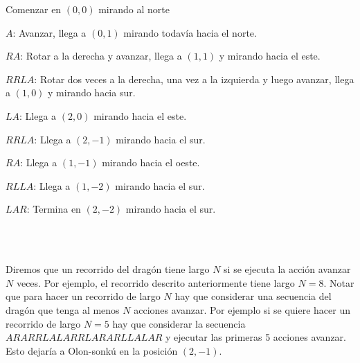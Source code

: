 \documentclass{oci}
\begin{document}
\begin{minipage}{0.45\textwidth}
\begin{itemize}
	{\footnotesize \item Comenzar en $(0,0)$ mirando al norte
	\item $A$:  Avanzar, llega a $(0,1)$ mirando todavía hacia el norte.
	\item $RA$: Rotar a la derecha y avanzar, llega a $(1,1)$ y mirando hacia el este.
	\item $RRLA$: Rotar dos veces a la derecha, una vez a la izquierda y luego avanzar, llega a $(1,0)$ y mirando hacia sur.
	\item $LA$: Llega a $(2,0)$ mirando hacia el este.
	\item $RRLA$: Llega a $(2,-1)$ mirando hacia el sur.
	\item $RA$: Llega a $(1,-1)$ mirando hacia el oeste.
	\item $RLLA$: Llega a $(1,-2)$ mirando hacia el sur.
	\item $LAR$:  Termina en $(2,-2)$ mirando hacia el sur.}
\end{itemize}
\end{minipage}
~%
\begin{minipage}{0.5\textwidth}
\begin{center}
\end{center}
\end{minipage}
\\

Diremos que un recorrido del dragón tiene largo $N$ si se ejecuta la acción avanzar $N$ veces.
Por ejemplo, el recorrido descrito anteriormente tiene largo $N = 8$.
Notar que para hacer un recorrido de largo $N$ hay que considerar una secuencia del dragón que tenga al menos $N$ acciones avanzar.
Por ejemplo si se quiere hacer un recorrido de largo $N=5$ hay que considerar la secuencia $ARARRLALARRLARARLLALAR$ y ejecutar
las primeras 5 acciones avanzar.
Esto dejaría a Olon-sonkú en la posición $(2,-1)$.
\end{document}
